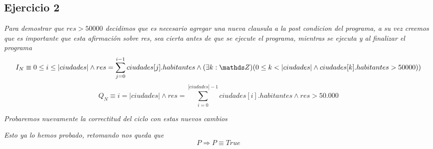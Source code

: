 \documentclass[10pt,a4paper]{article}
\begin{document}
\setcounter{subsection}{1}
\subsection{Ejercicio 2}

\noindent\textit{Para demostrar que $res>50000$ decidimos que es necesario agregar una nueva clausula a la post condicion del programa, a su vez creemos que es importante que esta afirmación sobre res, sea cierta antes de que se ejecute el programa, mientras se ejecuta y al finalizar el programa}
\[I_{N} \equiv 0 \leq i \leq |ciudades| \land res= \sum_{j=0}^{i-1} ciudades[j].habitantes \land (\exists k: \ent)(0 \leq k < |ciudades| \land 
 ciudades[k].habitantes > 50000)) \]
\[Q_{N}\equiv i=\lvert ciudades\rvert \land  res= \sum_{i=0}^{|ciudades|-1} ciudades[i].habitantes \land  res >50.000 \]


\noindent \textit{Probaremos nuevamente la correctitud del ciclo con estas nuevos cambios }

\begin{demo1}
	\textit{Esto ya lo hemos probado, retomando nos queda que}
	\[P \Longrightarrow P \equiv True\]
\end{demo1}
\end{document}
